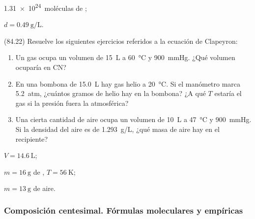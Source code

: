       \begin{solution}
        \begin{enumerate*}
          \item \SI{1.31e24}{moléculas} de ; \item \( d = \SI{0.49}{\gram\per\liter} \).
        \end{enumerate*}
      \end{solution}




      \begin{exercise}[
          tags    = {},
          topics  = {química,química básica},
          source  = {FQ 1B MGH 2016, p84, e22},
        ]
        (84.22) Resuelve los siguientes ejercicios referidos a la ecuación de Clapeyron:
        \begin{enumerate}
          \item Un gas ocupa un volumen de \SI{15}{\liter} a \SI{60}{\celsius} y \SI{900}{\mmHg}. ¿Qué volumen ocuparía en CN?
          \item En una bombona de \SI{15.0}{\liter} hay gas helio a \SI{20}{\celsius}. Si el manómetro marca \SI{5.2}{atm}, ¿cuántos gramos de helio hay en la bombona? ¿A qué \( T \) estaría el gas si la presión fuera la atmosférica?
          \item Una cierta cantidad de aire ocupa un volumen de \SI{10}{\liter} a \SI{47}{\celsius} y \SI{900}{\mmHg}. Si la densidad del aire es de \SI{1.293}{g/L}, ¿qué masa de aire hay en el recipiente?
        \end{enumerate}
      \end{exercise}

      \begin{solution}
        \begin{enumerate*}
          \item \( V = \SI{14.6}{\liter} \);
          \item \( m = \SI{16}{\gram} \) de , \( T = \SI{56}{\kelvin} \); \item \( m = \SI{13}{\gram} \) de aire.
        \end{enumerate*}
      \end{solution}






  \subsubsection*{Composición centesimal. Fórmulas moleculares y empíricas}

